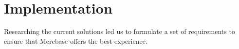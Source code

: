 \chapter{Implementation}
\label{chap:implementation}

\noindent Researching the current solutions led us to formulate a set of
requirements to ensure that Merebase offers the best experience.